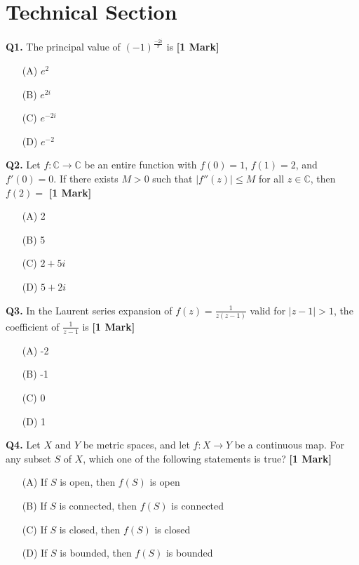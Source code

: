 \documentclass[11pt]{article}
\newcommand{\questiona}[2]{
    \noindent\textbf{Q#2.} #1 \hfill \textbf{[1 Mark]}
}
\begin{document}
\section*{Technical Section}

\questiona{The principal value of \( (-1)^{\frac{-2i}{\pi}} \) is}{1}
\begin{enumerate}
    \item[(A)] \( e^2 \)
    \item[(B)] \( e^{2i} \)
    \item[(C)] \( e^{-2i} \)
    \item[(D)] \( e^{-2} \)
\end{enumerate}
\vspace{0.5cm}

\questiona{Let \( f : \mathbb{C} \to \mathbb{C} \) be an entire function with \( f(0) = 1 \), \( f(1) = 2 \), and \( f'(0) = 0 \). If there exists \( M > 0 \) such that \( |f''(z)| \leq M \) for all \( z \in \mathbb{C} \), then \( f(2) = \)}{2}
\begin{enumerate}
    \item[(A)] 2
    \item[(B)] 5
    \item[(C)] \( 2 + 5i \)
    \item[(D)] \( 5 + 2i \)
\end{enumerate}
\vspace{0.5cm}

\questiona{In the Laurent series expansion of \( f(z) = \frac{1}{z(z - 1)} \) valid for \( |z - 1| > 1 \), the coefficient of \( \frac{1}{z - 1} \) is}{3}
\begin{enumerate}
    \item[(A)] -2
    \item[(B)] -1
    \item[(C)] 0
    \item[(D)] 1
\end{enumerate}
\vspace{0.5cm}

\questiona{Let \( X \) and \( Y \) be metric spaces, and let \( f : X \to Y \) be a continuous map. For any subset \( S \) of \( X \), which one of the following statements is true?}{4}
\begin{enumerate}
    \item[(A)] If \( S \) is open, then \( f(S) \) is open
    \item[(B)] If \( S \) is connected, then \( f(S) \) is connected
    \item[(C)] If \( S \) is closed, then \( f(S) \) is closed
    \item[(D)] If \( S \) is bounded, then \( f(S) \) is bounded
\end{enumerate}
\vspace{0.5cm}
\end{document}
